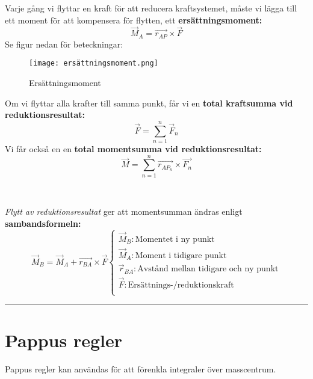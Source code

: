 \documentclass{article}
\newenvironment{ankiflashcard}[1][ ]{}{}
\newcommand{\ruler}{
\rule{0.5\textwidth}{0.5pt}
}
\begin{document}
\begin{paracol}{2}
\begin{ankiflashcard}
Varje gång vi flyttar en kraft för att reducera kraftsystemet, måste vi lägga till ett moment för att  kompensera för flytten, ett \newline
\textbf{ersättningsmoment:}
$$
\vec M_A = \vec{r_{AP}} \times \vec F
$$
Se figur nedan för beteckningar:
\begin{figure}[H]
    \centering
    \texttt{[image: ersättningsmoment.png]}
    \caption{Ersättningsmoment}
\end{figure}
Om vi flyttar alla krafter till samma punkt, får vi en \textbf{total kraftsumma vid reduktionsresultat:}
$$
\vec F = \overset{n}{\underset{n=1}{\sum}} \vec F_n
$$
Vi får också en en \textbf{total momentsumma vid reduktionsresultat:}
$$
\vec M = \overset{n}{\underset{n=1}{\sum}} \vec{r_{AP_n}} \times \vec{F_n}
$$

\end{ankiflashcard}
\


\begin{ankiflashcard}
    \textit{Flytt av reduktionsresultat} ger att momentsumman ändras enligt \textbf{sambandsformeln:}
$$
\vec M_B = \vec M_A + \vec{r_{BA}} \times \vec F\left\{\begin{array}{l}\vec M_B: \text{Momentet i ny punkt} \\\vec M_A: \text{Moment i tidigare punkt} \\\vec r_{BA}: \text{Avstånd mellan tidigare och ny punkt} \\\vec F: \text{Ersättnings-/reduktionskraft} \\\end{array}\right.$$
\end{ankiflashcard}
\ruler

\begin{ankiflashcard}
\section{Pappus regler}
Pappus regler kan användas för att förenkla integraler över masscentrum.

\end{ankiflashcard}
\end{paracol}
\end{document}
